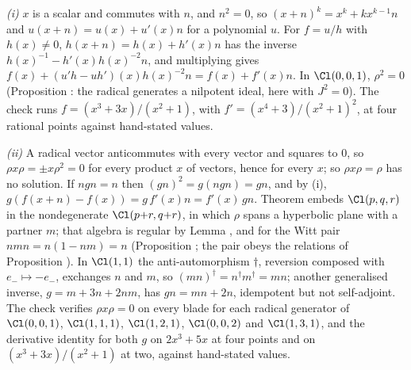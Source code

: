 \emph{(i)} $x$ is a scalar and commutes with $n$, and $n^{2} = 0$, so $(x + n)^{k} = x^{k} + kx^{k-1}n$ and $u(x + n) = u(x) + u'(x)n$ for a polynomial $u$. For $f = u/h$ with $h(x) \ne 0$, $h(x + n) = h(x) + h'(x)n$ has the inverse $h(x)^{-1} - h'(x)h(x)^{-2}n$, and multiplying gives $f(x) + (u'h - uh')(x)h(x)^{-2}n = f(x) + f'(x)n$. In $\Cl(0,0,1)$, $\rho^{2} = 0$ (Proposition : the radical generates a nilpotent ideal, here with $J^{2} = 0$). The check runs $f = (x^{3} + 3x)/(x^{2} + 1)$, with $f' = (x^{4} + 3)/(x^{2} + 1)^{2}$, at four rational points against hand-stated values.

\emph{(ii)} A radical vector anticommutes with every vector and squares to $0$, so $\rho x \rho = \pm x\rho^{2} = 0$ for every product $x$ of vectors, hence for every $x$; so $\rho x \rho = \rho$ has no solution. If $ngn = n$ then $(gn)^{2} = g(ngn) = gn$, and by (i), $g(f(x + n) - f(x)) = g\,f'(x)n = f'(x)\,gn$. Theorem  embeds $\Cl(p,q,r)$ in the nondegenerate $\Cl(p{+}r, q{+}r)$, in which $\rho$ spans a hyperbolic plane with a partner $m$; that algebra is regular by Lemma , and for the Witt pair $nmn = n(1 - nm) = n$ (Proposition ; the pair obeys the relations of Proposition ). In $\Cl(1,1)$ the anti-automorphism $\dagger$, reversion composed with $e_{-} \mapsto -e_{-}$, exchanges $n$ and $m$, so $(mn)^{\dagger} = n^{\dagger}m^{\dagger} = mn$; another generalised inverse, $g = m + 3n + 2nm$, has $gn = mn + 2n$, idempotent but not self-adjoint. The check verifies $\rho x \rho = 0$ on every blade for each radical generator of $\Cl(0,0,1)$, $\Cl(1,1,1)$, $\Cl(1,2,1)$, $\Cl(0,0,2)$ and $\Cl(1,3,1)$, and the derivative identity for both $g$ on $2x^{3} + 5x$ at four points and on $(x^{3} + 3x)/(x^{2} + 1)$ at two, against hand-stated values.


